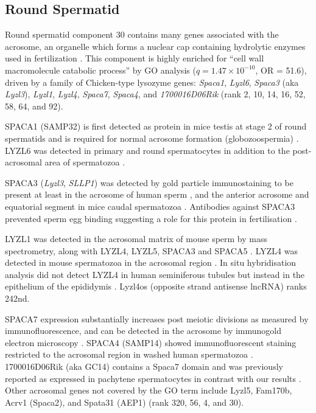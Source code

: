 \subsection{Round Spermatid}
Round spermatid component 30 contains many genes associated with the acrosome, an organelle which forms a nuclear cap containing hydrolytic enzymes used in fertilization \parencite{Ito2016Acrosome}.
This component is highly enriched for ``cell wall macromolecule catabolic process'' by GO analysis  ($q = 1.47\times10^{-10}$, OR = 51.6), driven by a family of Chicken-type lysozyme genes: \textit{Spaca1}, \textit{Lyzl6}, \textit{Spaca3} (aka \textit{Lyzl3}), \textit{Lyzl1}, \textit{Lyzl4}, \textit{Spaca7}, \textit{Spaca4}, and \textit{1700016D06Rik} (rank 2, 10, 14, 16, 52, 58, 64, and 92).

SPACA1 (SAMP32) is first detected as protein in mice testis at stage 2 of round spermatids and is required for normal acrosome formation (globozoospermia) \parencite{Hao2002SAMP32,Fujihara2012SPACA1deficient}.
LYZL6 was detected in primary and round spermatocytes in addition to the post-acrosomal area of spermatozoa \parencite{Wei2013Characterisation}.
 
SPACA3 (\textit{Lyzl3}, \textit{SLLP1}) was detected by gold particle immunostaining to be present at least in the acrosome of human sperm \parencite{Mandal2003SLLP1}, and the anterior acrosome and equatorial segment in mice caudal spermatozoa \parencite{Herrero2005Mouse}.
Antibodies against SPACA3 prevented sperm egg binding suggesting a role for this protein in fertilisation \parencite{Herrero2005Mouse}.

LYZL1 was detected in the acrosomal matrix of mouse sperm by mass spectrometry, along with LYZL4, LYZL5, SPACA3 and SPACA5 \parencite{Guyonnet2012Isolation}.
LYZL4 was detected in mouse spermatozoa in the acrosomal region \parencite{Sun2011Lyzl4}.
In situ hybridisation analysis did not detect LYZL4 in human seminiferous tubules but instead in the epithelium of the epididymis \parencite{Zhang2005Molecular}.
Lyzl4os (opposite strand antisense lncRNA) ranks 242nd.

SPACA7 expression substantially increases post meiotic divisions as measured by immunofluorescence, and can be detected in the acrosome by immunogold electron microscopy \parencite{Korfanty2012Identification,Nguyen2014SPACA7}.
SPACA4 (SAMP14) showed immunofluorescent staining restricted to the acrosomal region in washed human spermatozoa \parencite{Shetty2003SAMP14}.
1700016D06Rik (aka GC14) contains a Spaca7 domain and was previously reported as expressed in pachytene spermatocytes in contrast with our results \parencite{Anway2003Expression}.
Other acrosomal genes not covered by the GO term include Lyzl5, Fam170b, Acrv1 (Spaca2), and Spata31 (AEP1) (rank 320, 56, 4, and 30).

